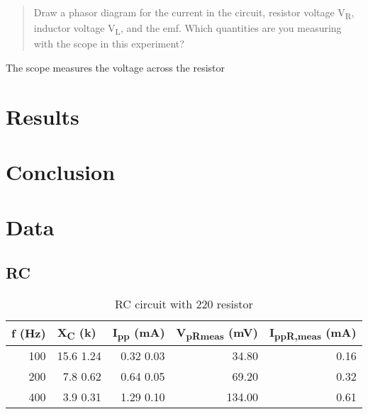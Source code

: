 \documentclass{article}
\begin{document}
		\begin{quotation}
			Draw a phasor diagram for the current in the circuit, resistor voltage V\textsubscript{R}, inductor voltage V\textsubscript{L}, and the emf. Which quantities are you measuring with the scope in this experiment?
		\end{quotation}
		The scope measures the voltage across the resistor

	\section{Results}
	\section{Conclusion}
	\section*{Data}
		\subsection*{RC}
			\begin{table}[h]
				\caption{RC circuit with 220 \textOmega{} resistor}
				\centering
				\label{tab:1}
				\begin{tabular}{@{}rrrrr@{}}
					\toprule
					\multicolumn{1}{l}{f (Hz)} & \multicolumn{1}{l}{X\textsubscript{C} (k\textOmega{})} & \multicolumn{1}{l}{I\textsubscript{pp} (mA)} & \multicolumn{1}{l}{V\textsubscript{pRmeas} (mV)} & \multicolumn{1}{l}{I\textsubscript{ppR,meas} (mA)} \\ \midrule
					100 & 15.6 \textpm{} 1.24 & 0.32 \textpm{} 0.03 & 34.80  & 0.16 \\
					200 & 7.8 \textpm{} 0.62  & 0.64 \textpm{} 0.05 & 69.20  & 0.32 \\
					400 & 3.9 \textpm{} 0.31  & 1.29 \textpm{} 0.10 & 134.00 & 0.61 \\ \bottomrule
				\end{tabular}
			\end{table}
\end{document}
